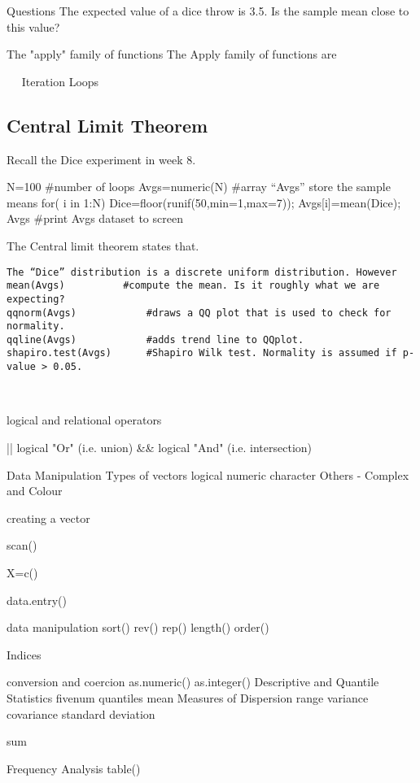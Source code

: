 Questions
The expected value of a dice throw is 3.5. Is the sample mean close to this value?

The "apply" family of functions
 The Apply family of functions are 


 
Iteration Loops
\subsection*{Central Limit Theorem}
Recall the Dice experiment in week 8.

N=100				#number of loops
Avgs=numeric(N)		#array “Avgs” store the sample means
for( i in 1:N)
	{	Dice=floor(runif(50,min=1,max=7));	Avgs[i]=mean(Dice);
	}
Avgs				#print Avgs dataset to screen

The Central limit theorem states that.
\begin{verbatim}
The “Dice” distribution is a discrete uniform distribution. However 
mean(Avgs)			#compute the mean. Is it roughly what we are expecting?
qqnorm(Avgs)			#draws a QQ plot that is used to check for normality.
qqline(Avgs)			#adds trend line to QQplot.
shapiro.test(Avgs)		#Shapiro Wilk test. Normality is assumed if p-value > 0.05.
\end{verbatim}
			
 \newpage



logical and relational operators
 
||      logical "Or"      (i.e.  union)
&&     logical "And"   (i.e. intersection)   

 



Data Manipulation
Types of vectors
	logical
	numeric
	character
    Others  - Complex and Colour

creating a vector

scan()

X=c()

data.entry()

data manipulation
sort()
rev()
rep()
length()
order()


Indices

 

 

 
conversion and coercion
as.numeric()
as.integer()
Descriptive and Quantile Statistics
fivenum
quantiles
mean
Measures of Dispersion
  range
  variance
  covariance
  standard deviation

sum

 
 

Frequency Analysis
table()
 
